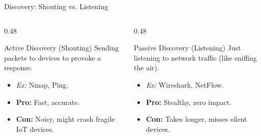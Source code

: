 \documentclass[aspectratio=169]{beamer}  %
\begin{document}
\begin{frame}{Discovery: Shouting vs. Listening}
    \begin{columns}[T]
        \begin{column}{0.48\textwidth}
            \begin{block}{Active Discovery (Shouting)}
                \footnotesize
                Sending packets to devices to provoke a response.
                \begin{itemize}
                    \item \textit{Ex:} Nmap, Ping.
                    \item \textbf{Pro:} Fast, accurate.
                    \item \textbf{Con:} Noisy, might crash fragile IoT devices.
                \end{itemize}
            \end{block}
        \end{column}
        \begin{column}{0.48\textwidth}
            \begin{block}{Passive Discovery (Listening)}
                \footnotesize
                Just listening to network traffic (like sniffing the air).
                \begin{itemize}
                    \item \textit{Ex:} Wireshark, NetFlow.
                    \item \textbf{Pro:} Stealthy, zero impact.
                    \item \textbf{Con:} Takes longer, misses silent devices.
                \end{itemize}
            \end{block}
        \end{column}
    \end{columns}
    \vspace{0.5cm}
    \begin{center}
    \end{center}
\end{frame}
\end{document}
